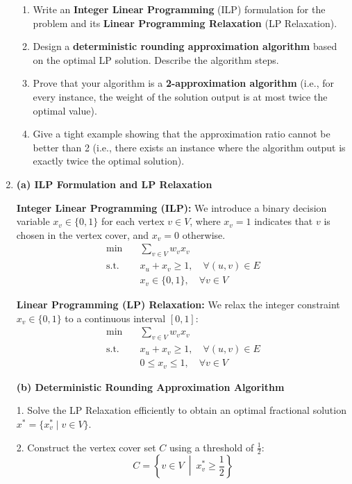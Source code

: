 \documentclass[12pt,a4paper]{article}
\makeatletter
\newtheorem*{solution}{Solution}
\theoremstyle{definition}
\renewenvironment{solution}[1][Solution] {\par\pushQED{\qed}\normalfont\topsep6\p@\@plus6\p@\relax\trivlist\item[\hskip\labelsep\bfseries#1\@addpunct{.}]\ignorespaces}{\popQED\endtrivlist\@endpefalse} \makeatother
\makeatother
\begin{document}
\begin{enumerate}
\begin{enumerate}
    \item Write an \textbf{Integer Linear Programming} (ILP) formulation for the problem and its \textbf{Linear Programming Relaxation} (LP Relaxation).
    \item Design a \textbf{deterministic rounding approximation algorithm} based on the optimal LP solution. Describe the algorithm steps.
    \item Prove that your algorithm is a \textbf{2-approximation algorithm} (i.e., for every instance, the weight of the solution output is at most twice the optimal value).
    \item Give a tight example showing that the approximation ratio cannot be better than 2 (i.e., there exists an instance where the algorithm output is exactly twice the optimal solution).
\end{enumerate}
  
  \begin{solution}
  \textbf{(a) ILP Formulation and LP Relaxation}

  \textbf{Integer Linear Programming (ILP):}
  We introduce a binary decision variable $x_v \in \{0, 1\}$ for each vertex $v \in V$, where $x_v = 1$ indicates that $v$ is chosen in the vertex cover, and $x_v = 0$ otherwise.
  \begin{align*}
  \min \quad & \sum_{v \in V} w_v x_v \\
  \text{s.t.} \quad & x_u + x_v \ge 1, \quad \forall (u,v) \in E \\
  & x_v \in \{0, 1\}, \quad \forall v \in V
  \end{align*}

  \textbf{Linear Programming (LP) Relaxation:}
  We relax the integer constraint $x_v \in \{0, 1\}$ to a continuous interval $[0, 1]$:
  \begin{align*}
  \min \quad & \sum_{v \in V} w_v x_v \\
  \text{s.t.} \quad & x_u + x_v \ge 1, \quad \forall (u,v) \in E \\
  & 0 \le x_v \le 1, \quad \forall v \in V
  \end{align*}

  \textbf{(b) Deterministic Rounding Approximation Algorithm}

      1. Solve the LP Relaxation efficiently to obtain an optimal fractional solution $x^* = \{x_v^* \mid v \in V\}$.
      
      2. Construct the vertex cover set $C$ using a threshold of $\frac{1}{2}$:
      \[
      C = \left\{ v \in V \ \middle|\ x_v^* \ge \frac{1}{2} \right\}
      \]
      

\end{solution}
\end{enumerate}
\end{document}
